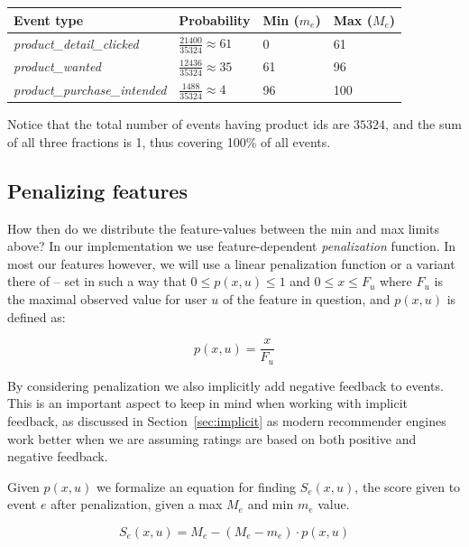 \begin{table}[H]
  \centering
  \begin{tabular}{llll}
    \toprule
      Event type & Probability & Min ($m_e$) & Max ($M_e$) \\
    \midrule
      \textit{product\_detail\_clicked}     & $\frac{21400}{35324} \approx 61$  & 0   & 61  \\[1.5ex]
      \textit{product\_wanted}              & $\frac{12436}{35324} \approx 35$  & 61  & 96  \\[1.5ex]
      \textit{product\_purchase\_intended}  & $\frac{1488}{35324} \approx 4$    & 96  & 100 \\
    \bottomrule
  \end{tabular}
\end{table}

Notice that the total number of events having product ids are $35324$, and the
sum of all three fractions is 1, thus covering 100\% of all events.

\subsection{Penalizing features}

How then do we distribute the feature-values  between the min and max limits
above? In our implementation we use feature-dependent \textit{penalization}
function. In most our features however, we will use a linear penalization
function or a variant there of -- set in such a way that $0 \leq p(x,u) \leq 1$
and $0 \leq x \leq F_u$ where $F_u$ is the maximal observed value for user $u$
of the feature in question, and $p(x,u)$ is defined as:

\begin{equation}
  p(x, u) = \frac{x}{F_u}
  \label{eq-lin-penalization}
\end{equation}

By considering penalization we also implicitly add negative feedback to events.
This is an important aspect to keep in mind when working with implicit
feedback, as discussed in Section~\ref{sec:implicit} as modern recommender
engines work better when we are assuming ratings are based on both positive and
negative feedback.

Given $p(x, u)$ we formalize an equation for finding $S_e(x, u)$, the score
given to event $e$ after penalization, given a max $M_e$ and min $m_e$ value.

\begin{equation}
  S_e(x,u) = M_e - (M_e - m_e) \cdot p(x, u)
\end{equation}

